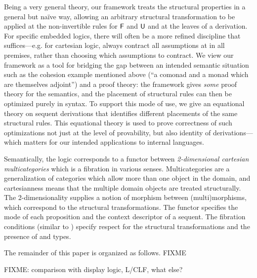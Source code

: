 Being a very general theory, our framework treats the structural
properties in a general but na\"ive way, allowing an arbitrary
structural transformation to be applied at the non-invertible rules for
$\mathsf{F}$ and $\mathsf{U}$ and at the leaves of a derivation.  For specific
embedded logics, there will often be a more refined discipline that
suffices---e.g. for cartesian logic, always contract all assumptions at
in all premises, rather than choosing which assumptions to contract.  We
view our framework as a tool for bridging the gap between an intended
semantic situation such as the cohesion example mentioned above (``a
comonad and a monad which are themselves adjoint'') and a proof theory:
the framework gives \emph{some} proof theory for the semantics, and the
placement of structural rules can then be optimized purely in syntax.
To support this mode of use, we give an equational theory on sequent
derivations that identifies different placements of the same structural
rules.  This equational theory is used to prove correctness of such
optimizations not just at the level of provability, but also identity of
derivations---which matters for our intended applications to internal
languages.

Semantically, the logic corresponds to a functor between
\emph{2-dimensional cartesian multicategories} which is a fibration in
various senses.  Multicategories are a generalization of categories
which allow more than one object in the domain, and cartesianness means
that the multiple domain objects are treated structurally.  The
2-dimensionality supplies a notion of morphism between (multi)morphisms,
which correspond to the structural transformations.  The functor
specifies the mode of each proposition and the context descriptor of a
sequent.  The fibration conditions (similar to \citep{hermida,hormann})
specify respect for the structural transformations and the presence of
 and  types.

The remainder of this paper is organized as follows.  FIXME

FIXME: comparison with display logic, L/CLF, what else?  

